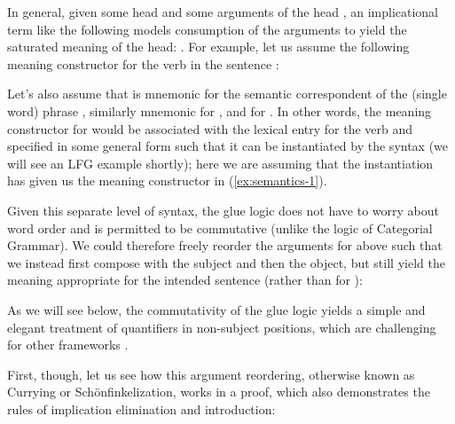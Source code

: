 In general, given some head  and some arguments of the head
, an implicational term like the following
models consumption of the arguments to yield the saturated meaning of
the head: . For
example, let us assume the following meaning constructor for the verb
 in the sentence :
%
\begin{exe}
  
\ex \label{ex:semantics-1} 
\end{exe}
%
Let's also assume that  is mnemonic for the semantic
correspondent of the (single word) phrase , 
similarly mnemonic for , and  for
. In other words, the meaning constructor for 
would be associated with the lexical entry for the verb and specified
in some general form such that it can be instantiated by the syntax
(we will see an LFG example shortly); here we are assuming that the
instantiation has given us the meaning constructor in
(\ref{ex:semantics-1}).

Given this separate level of syntax, the glue logic does not
have to worry about word order and is permitted to be commutative
(unlike the logic of Categorial Grammar). We could therefore freely
reorder the arguments for  above such that we instead
first compose with the subject and then the object, but still yield
the meaning appropriate for the intended sentence 
(rather than for ):
%
\begin{exe}
  
\ex \label{ex:semantics-2}
\end{exe}
%
As we will see below, the commutativity of the glue logic yields a
simple and elegant treatment of quantifiers in non-subject positions,
which are challenging for other frameworks \citep[see, for example, the
careful pedagogical presentation of the issue
in][244--263]{jacobson14}. 

First, though, let us see how this argument reordering, otherwise
known as Currying or Schönfinkelization, works in a
proof, which also demonstrates the rules of implication elimination
and introduction:
%
\begin{exe}
  \ex \label{ex:semantics-3}
\end{exe}

